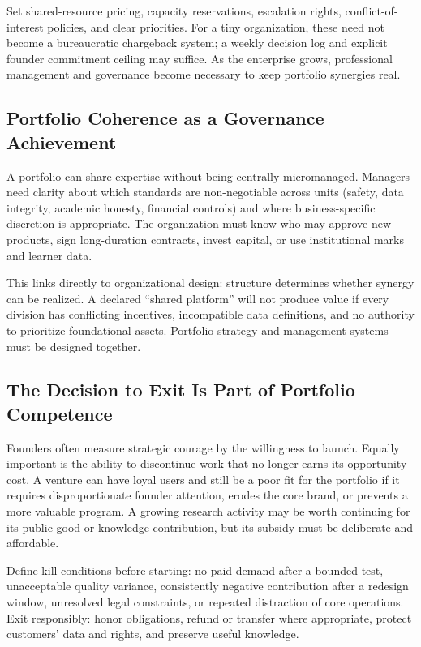 Set shared-resource pricing, capacity reservations, escalation rights, conflict-of-interest policies, and clear priorities. For a tiny organization, these need not become a bureaucratic chargeback system; a weekly decision log and explicit founder commitment ceiling may suffice. As the enterprise grows, professional management and governance become necessary to keep portfolio synergies real.

\subsection{Portfolio Coherence as a Governance Achievement}
\label{sec:portfolio_coherence_governance}

A portfolio can share expertise without being centrally micromanaged. Managers need clarity about which standards are non-negotiable across units (safety, data integrity, academic honesty, financial controls) and where business-specific discretion is appropriate. The organization must know who may approve new products, sign long-duration contracts, invest capital, or use institutional marks and learner data.

This links directly to organizational design: structure determines whether synergy can be realized. A declared ``shared platform'' will not produce value if every division has conflicting incentives, incompatible data definitions, and no authority to prioritize foundational assets. Portfolio strategy and management systems must be designed together.

\subsection{The Decision to Exit Is Part of Portfolio Competence}
\label{sec:decision_to_exit_portfolio_competence}

Founders often measure strategic courage by the willingness to launch. Equally important is the ability to discontinue work that no longer earns its opportunity cost. A venture can have loyal users and still be a poor fit for the portfolio if it requires disproportionate founder attention, erodes the core brand, or prevents a more valuable program. A growing research activity may be worth continuing for its public-good or knowledge contribution, but its subsidy must be deliberate and affordable.

Define kill conditions before starting: no paid demand after a bounded test, unacceptable quality variance, consistently negative contribution after a redesign window, unresolved legal constraints, or repeated distraction of core operations. Exit responsibly: honor obligations, refund or transfer where appropriate, protect customers' data and rights, and preserve useful knowledge.
